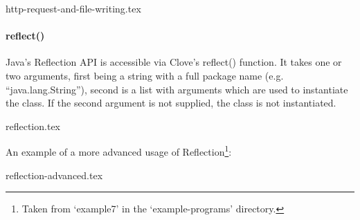 \documentclass[12pt,a4paper]{article}
\begin{document}
{http-request-and-file-writing.tex}


\vspace{-2.75em}
\paragraph*{reflect()}
Java's Reflection API is accessible via Clove's reflect() function. It takes one or two arguments, first being a string with a full package name (e.g. ``java.lang.String''), second is a list with arguments which are used to instantiate the class. If the second argument is not supplied, the class is not instantiated.

{reflection.tex}

\vspace{-1.5em}
\noindent An example of a more advanced usage of Reflection\footnote{Taken from `example7' in the `example-programs' directory.}:

{reflection-advanced.tex}
\end{document}
